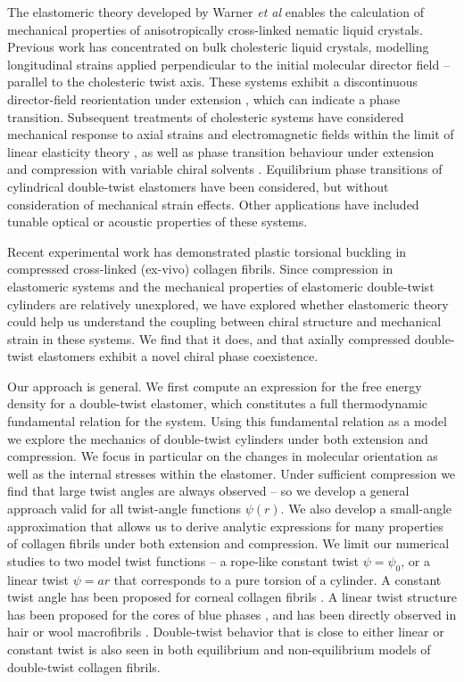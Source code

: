 \documentclass[twoside,twocolumn,9pt]{article}
\begin{document}
The elastomeric theory developed by Warner \textit{et al} \cite{Warner:1996} enables the calculation of mechanical properties of anisotropically cross-linked nematic liquid crystals. Previous work has concentrated on bulk cholesteric liquid crystals, modelling longitudinal strains applied perpendicular to the initial molecular director field -- parallel to the cholesteric twist axis. These systems exhibit a discontinuous director-field reorientation under extension \cite{Warner:2000}, which can indicate a phase transition. Subsequent treatments of cholesteric systems have considered mechanical response to axial strains and electromagnetic fields within the limit of linear elasticity theory \cite{Menzel:2007}, as well as phase transition behaviour under extension and compression with variable chiral solvents \cite{Stille:2009}. Equilibrium phase transitions of cylindrical double-twist elastomers have been considered, \cite{Xing:2008} but without consideration of mechanical strain effects. Other applications have included tunable optical \cite{Finkelmann:2001} or acoustic \cite{Biscari:2014} properties of these systems.

Recent experimental work has demonstrated plastic torsional buckling in compressed cross-linked (ex-vivo) collagen fibrils.\cite{Peacock:2020} Since compression in elastomeric systems and the mechanical properties of elastomeric double-twist cylinders are relatively unexplored, we have explored whether elastomeric theory could help us understand the coupling between chiral structure and mechanical strain in these systems. We find that it does, and that axially compressed double-twist elastomers exhibit a novel chiral phase coexistence. 

Our approach is general. We first compute an expression for the free energy density for a double-twist elastomer, which constitutes a full thermodynamic fundamental relation for the system. Using this fundamental relation as a model we explore the mechanics of double-twist cylinders under both extension and compression. We focus in particular on the changes in molecular orientation as well as the internal stresses within the elastomer. Under sufficient compression we find that large twist angles are always observed -- so we develop a general approach valid for all twist-angle functions $\psi(r)$. We also develop a small-angle approximation that allows us to derive analytic expressions for many properties of collagen fibrils under both extension and compression.  We limit our numerical studies to two model twist functions -- a rope-like constant twist $\psi=\psi_0$, or a linear twist $\psi = a r$ that corresponds to a pure torsion of a cylinder. A constant twist angle has been proposed for corneal collagen fibrils \cite{Ottani:2001, Holmes:2001}. A linear twist structure has been proposed for the cores of blue phases \cite{Wright:1989}, and has been directly observed in hair or wool macrofibrils \cite{Bryson:2009, Harland:2011}. Double-twist behavior that is close to either linear or constant twist is also seen in both equilibrium \cite{Cameron:2020} and non-equilibrium \cite{Leighton:2021a} models of double-twist collagen fibrils.
\end{document}
